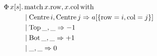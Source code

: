\begin{align*}
\Phi\, x[s] \ldotp&\, \mathrm{match}\,x{.}\mathrm{row}, x{.}\mathrm{col}\,\mathrm{with} \\
&\mid \mathrm{Centre}\,i, \mathrm{Centre}\,j \Rightarrow a[\srecordval{ \mathrm{row}= i, \mathrm{col}= j }] \\
&\mid \mathrm{Top}\,\_, \_ \Rightarrow -1 \\
&\mid \mathrm{Bot}\,\_, \_ \Rightarrow +1  \\
&\mid \_, \_ \Rightarrow 0
\end{align*}
